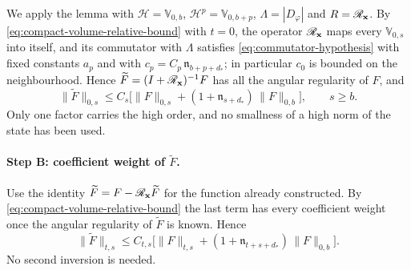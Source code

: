 We apply the lemma with $\mathcal H=\mathbb V_{0,b}$,
$\mathcal H^p=\mathbb V_{0,b+p}$, $\Lambda=|D_\varphi|$ and
$R=\mathscr R_{\mathbf x}$. By \eqref{eq:compact-volume-relative-bound}
with $t=0$, the operator $\mathscr R_{\mathbf x}$ maps every
$\mathbb V_{0,s}$ into itself, and its commutator with $\Lambda$
satisfies \eqref{eq:commutator-hypothesis} with fixed constants $a_p$
and with $c_p=C_p\,\mathfrak n_{b+p+d_*}$; in particular $c_0$ is
bounded on the neighbourhood. Hence
$\widetilde F=(I+\mathscr R_{\mathbf x})^{-1}F$ has all the angular
regularity of $F$, and
\begin{equation}\label{eq:angular-resolvent-bound}
 \|\widetilde F\|_{0,s}
 \le C_s\bigl[\|F\|_{0,s}+(1+\mathfrak n_{s+d_*})\,\|F\|_{0,b}\bigr],
 \qquad s\ge b .
\end{equation}
Only one factor carries the high order, and no smallness of a high
norm of the state has been used.

\paragraph{Step B: coefficient weight of $\widetilde F$.}
Use the identity
$\widetilde F=F-\mathscr R_{\mathbf x}\widetilde F$ for the function
already constructed. By \eqref{eq:compact-volume-relative-bound} the
last term has every coefficient weight once the angular regularity of
$\widetilde F$ is known. Hence
\begin{equation}\label{eq:full-source-tame-resolvent}
 \|\widetilde F\|_{t,s}
 \le C_{t,s}\bigl[\|F\|_{t,s}
       +(1+\mathfrak n_{t+s+d_*})\,\|F\|_{0,b}\bigr] .
\end{equation}
No second inversion is needed.

